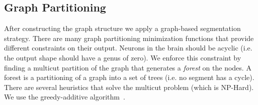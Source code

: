 \subsection{Graph Partitioning}

After constructing the graph structure we apply a graph-based segmentation strategy. 
There are many graph partitioning minimization functions that provide different constraints on their output. 
Neurons in the brain should be acyclic (i.e. the output shape should have a genus of zero). 
We enforce this constraint by finding a multicut partition of the graph that generates a \textit{forest} on the nodes. 
A forest is a partitioning of a graph into a set of trees (i.e. no segment has a cycle). 
There are several heuristics that solve the multicut problem (which is NP-Hard). 
We use the greedy-additive algorithm~\cite{keuper2015efficient}.